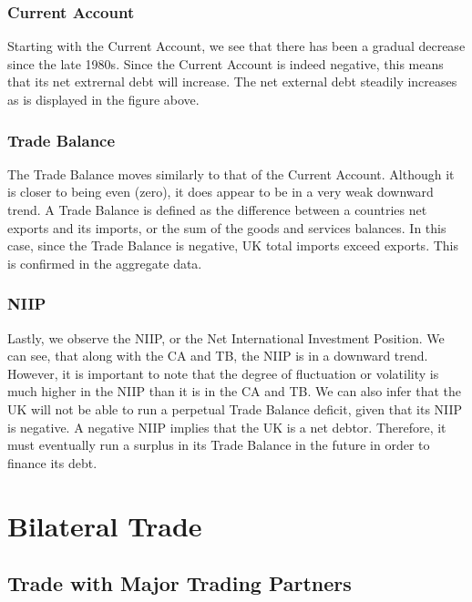 \documentclass[12pt]{article}
\begin{document}
\subsubsection{Current Account}

Starting with the Current Account, we see that there has been a gradual decrease since the late 1980s. Since the Current Account is indeed negative, this means that its net extrernal debt will increase. The net external debt steadily increases as is displayed in the figure above.

\subsubsection{Trade Balance}

The Trade Balance moves similarly to that of the Current Account. Although it is closer to being even (zero), it does appear to be in a very weak downward trend. A Trade Balance is defined as the difference between a countries net exports and its imports, or the sum of the goods and services balances. In this case, since the Trade Balance is negative, UK total imports exceed exports. This is confirmed in the aggregate data.

\subsubsection{NIIP}

Lastly, we observe the NIIP, or the Net International Investment Position. We can see, that along with the CA and TB, the NIIP is in a downward trend. However, it is important to note that the degree of fluctuation or volatility is much higher in the NIIP than it is in the CA and TB. We can also infer that the UK will not be able to run a perpetual Trade Balance deficit, given that its NIIP is negative. A negative NIIP implies that the UK is a net debtor. Therefore, it must eventually run a surplus in its Trade Balance in the future in order to finance its debt.

\newpage

\section{Bilateral Trade}

\subsection{Trade with Major Trading Partners}
\end{document}

